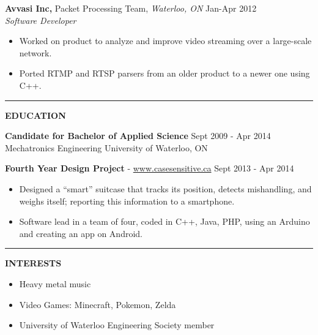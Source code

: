 \documentclass{letter}
\begin{document}
{\bf Avvasi Inc,} Packet Processing Team, {\sl Waterloo, ON} \hfill Jan-Apr 2012 \\
{\sl Software Developer}
\begin{itemize}
  \item Worked on product to analyze and improve video streaming over a large-scale network.
  \item Ported RTMP and RTSP parsers from an older product to a newer one using C++.
\end{itemize}

\vskip 2pt
\hrule
{\large\bf EDUCATION}

{\bf Candidate for Bachelor of Applied Science} \hfill Sept 2009 - Apr 2014 \\
Mechatronics Engineering \hfill University of Waterloo, ON

{\bf Fourth Year Design Project} - \href{http://www.casesensitive.ca}{www.casesensitive.ca} \hfill Sept 2013 - Apr 2014
\begin{itemize}
  \item Designed a ``smart'' suitcase that tracks its position, detects mishandling, and weighs itself; reporting this information to a smartphone.
  \item Software lead in a team of four, coded in C++, Java, PHP, using an Arduino and creating an app on Android.
\end{itemize}

\vskip 2pt
\hrule
{\large\bf INTERESTS}
\begin{itemize}
  \item Heavy metal music
  \item Video Games: Minecraft, Pokemon, Zelda
  \item University of Waterloo Engineering Society member
\end{itemize}
\end{document}
